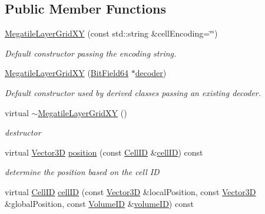 \subsection*{Public Member Functions}
\begin{DoxyCompactItemize}
\item 
\hyperlink{class_d_d4hep_1_1_d_d_segmentation_1_1_megatile_layer_grid_x_y_a9795d16d3a1423824a95e6b753dc90e8}{Megatile\+Layer\+Grid\+XY} (const std\+::string \&cell\+Encoding=\char`\"{}\char`\"{})
\begin{DoxyCompactList}\small\item\em Default constructor passing the encoding string. \end{DoxyCompactList}\item 
\hyperlink{class_d_d4hep_1_1_d_d_segmentation_1_1_megatile_layer_grid_x_y_ad60883ac07ec3cec93063cab4d79a76d}{Megatile\+Layer\+Grid\+XY} (\hyperlink{class_d_d4hep_1_1_d_d_segmentation_1_1_bit_field64}{Bit\+Field64} $\ast$\hyperlink{class_d_d4hep_1_1_d_d_segmentation_1_1_segmentation_abec3489982d0fe91ef4b142d9d755576}{decoder})
\begin{DoxyCompactList}\small\item\em Default constructor used by derived classes passing an existing decoder. \end{DoxyCompactList}\item 
virtual \hyperlink{class_d_d4hep_1_1_d_d_segmentation_1_1_megatile_layer_grid_x_y_a3ba425f7256a951d0d5b451261023009}{$\sim$\+Megatile\+Layer\+Grid\+XY} ()
\begin{DoxyCompactList}\small\item\em destructor \end{DoxyCompactList}\item 
virtual \hyperlink{struct_d_d4hep_1_1_d_d_segmentation_1_1_vector3_d}{Vector3D} \hyperlink{class_d_d4hep_1_1_d_d_segmentation_1_1_megatile_layer_grid_x_y_a7ec0272831c54892acf762c97a857083}{position} (const \hyperlink{namespace_d_d4hep_1_1_d_d_segmentation_ac7af071d85cb48820914434a07e21ba1}{Cell\+ID} \&\hyperlink{class_d_d4hep_1_1_d_d_segmentation_1_1_megatile_layer_grid_x_y_a594269129ed71d3dbb0b9da7181fa58a}{cell\+ID}) const
\begin{DoxyCompactList}\small\item\em determine the position based on the cell ID \end{DoxyCompactList}\item 
virtual \hyperlink{namespace_d_d4hep_1_1_d_d_segmentation_ac7af071d85cb48820914434a07e21ba1}{Cell\+ID} \hyperlink{class_d_d4hep_1_1_d_d_segmentation_1_1_megatile_layer_grid_x_y_a594269129ed71d3dbb0b9da7181fa58a}{cell\+ID} (const \hyperlink{struct_d_d4hep_1_1_d_d_segmentation_1_1_vector3_d}{Vector3D} \&local\+Position, const \hyperlink{struct_d_d4hep_1_1_d_d_segmentation_1_1_vector3_d}{Vector3D} \&global\+Position, const \hyperlink{namespace_d_d4hep_1_1_d_d_segmentation_a61a6833a18d1800bdef176595f83e3ba}{Volume\+ID} \&\hyperlink{class_d_d4hep_1_1_d_d_segmentation_1_1_segmentation_a43c0e9648e3b7cded015847c0802f757}{volume\+ID}) const

\end{DoxyCompactItemize}
